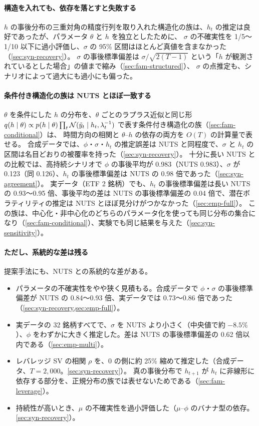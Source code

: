 \paragraph{構造を入れても、依存を落とすと失敗する}
$h$ の事後分布の三重対角の精度行列を取り入れた構造化の族は、$h_t$ の推定は良好であったが、パラメータ $\theta$ と $h$ を独立としたために、
$\sigma$ の不確実性を 1/5〜1/10 以下に過小評価し、$\sigma$ の 95\% 区間はほとんど真値を含まなかった（\cref{sec:syn-recovery}）。
$\sigma$ の事後標準偏差は $\sigma/\sqrt{2(T-1)}$ という「$h$ が観測されているとした場合」の値まで縮み（\cref{sec:fam-structured}）、
$\sigma$ の点推定も、シナリオによって過大にも過小にも偏った。

\paragraph{条件付き構造化の族は NUTS とほぼ一致する}
$\theta$ を条件にした $h$ の分布を、$\theta$ ごとのラプラス近似と同じ形 $q(h \mid \theta) \propto p(h \mid \theta) \prod_t \mathcal{N}(\tilde y_t \mid h_t, \lambda_t^{-1})$ で表す条件付き構造化の族（\cref{sec:fam-conditional}）は、
時間方向の相関と $\theta$–$h$ の依存の両方を $O(T)$ の計算量で表せる。
合成データでは、$\phi$・$\sigma$・$h_t$ の推定誤差は NUTS と同程度で、$\sigma$ と $h_t$ の区間は名目どおりの被覆率を持った（\cref{sec:syn-recovery}）。
十分に長い NUTS との比較では、高持続シナリオで $\phi$ の事後平均が 0.983（NUTS 0.983）、$\sigma$ が 0.123（同 0.126）、$h_t$ の事後標準偏差は NUTS の 0.98 倍であった（\cref{sec:syn-agreement}）。
実データ（ETF 2 銘柄）でも、$h_t$ の事後標準偏差は長い NUTS の 0.93〜0.95 倍、事後平均の差は NUTS の事後標準偏差の 0.04 倍で、潜在ボラティリティの推定は NUTS とほぼ見分けがつかなかった（\cref{sec:emp-full}）。
この族は、中心化・非中心化のどちらのパラメータ化を使っても同じ分布の集合になり（\cref{sec:fam-conditional}）、実験でも同じ結果を与えた（\cref{sec:syn-sensitivity}）。

\paragraph{ただし、系統的な差は残る}
提案手法にも、NUTS との系統的な差がある。
\begin{itemize}
  \item パラメータの不確実性をやや狭く見積もる。合成データで $\phi$・$\sigma$ の事後標準偏差が NUTS の 0.84〜0.93 倍、実データでは 0.73〜0.86 倍であった（\cref{sec:syn-recovery,sec:emp-full}）。
  \item 実データの 32 銘柄すべてで、$\sigma$ を NUTS より小さく（中央値で約 $-8.5\%$）、$\phi$ をわずかに大きく推定した。差は NUTS の事後標準偏差の 0.62 倍以内である（\cref{sec:emp-multi}）。
  \item レバレッジ SV の相関 $\rho$ を、0 の側に約 25\% 縮めて推定した（合成データ、$T = 2{,}000$。\cref{sec:syn-recovery}）。
    真の事後分布で $h_{t+1}$ が $h_t$ に非線形に依存する部分を、正規分布の族では表せないためである（\cref{sec:fam-leverage}）。
  \item 持続性が高いとき、$\mu$ の不確実性を過小評価した（$\mu$–$\phi$ のバナナ型の依存。\cref{sec:syn-recovery}）。
\end{itemize}

